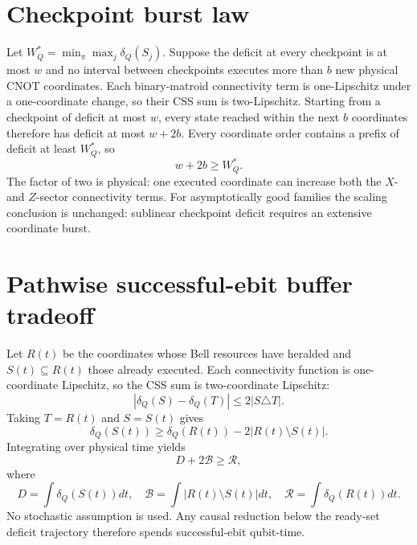 \documentclass[aps,prx,preprint,superscriptaddress,nofootinbib,longbibliography]{revtex4-2}
\begin{document}
\section{Checkpoint burst law}
Let $W_Q^*=\min_\pi\max_j\delta_Q(S_j)$. Suppose the deficit at every checkpoint is at most $w$ and no interval between checkpoints executes more than $b$ new physical CNOT coordinates. Each binary-matroid connectivity term is one-Lipschitz under a one-coordinate change, so their CSS sum is two-Lipschitz. Starting from a checkpoint of deficit at most $w$, every state reached within the next $b$ coordinates therefore has deficit at most $w+2b$. Every coordinate order contains a prefix of deficit at least $W_Q^*$, so
\begin{equation}
\boxed{w+2b\ge W_Q^*.}
\end{equation}
The factor of two is physical: one executed coordinate can increase both the $X$- and $Z$-sector connectivity terms. For asymptotically good families the scaling conclusion is unchanged: sublinear checkpoint deficit requires an extensive coordinate burst.

\section{Pathwise successful-ebit buffer tradeoff}
Let $R(t)$ be the coordinates whose Bell resources have heralded and $S(t)\subseteq R(t)$ those already executed. Each connectivity function is one-coordinate Lipschitz, so the CSS sum is two-coordinate Lipschitz:
\begin{equation}
|\delta_Q(S)-\delta_Q(T)|\le2|S\triangle T|.
\end{equation}
Taking $T=R(t)$ and $S=S(t)$ gives
\begin{equation}
\delta_Q(S(t))\ge\delta_Q(R(t))-2|R(t)\setminus S(t)|.
\end{equation}
Integrating over physical time yields
\begin{equation}
D+2\mathcal B\ge\mathcal R,
\end{equation}
where
\begin{equation}
D=\int\delta_Q(S(t))dt,\quad \mathcal B=\int|R(t)\setminus S(t)|dt,\quad \mathcal R=\int\delta_Q(R(t))dt.
\end{equation}
No stochastic assumption is used. Any causal reduction below the ready-set deficit trajectory therefore spends successful-ebit qubit-time.
\end{document}
